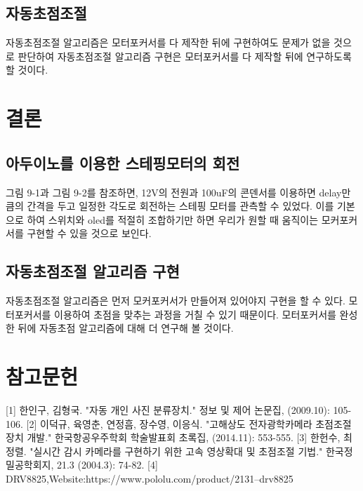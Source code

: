 \subsection{자동초점조절}
	
	자동초점조절 알고리즘은 모터포커서를 다 제작한 뒤에 구현하여도 문제가 없을 것으로 판단하여 자동초점조절 알고리즘 구현은 모터포커서를 다 제작할 뒤에 연구하도록 할 것이다.
	
	\section{결론}
	
	\subsection{아두이노를 이용한 스테핑모터의 회전}
	
	그림 9-1과 그림 9-2를 참조하면, 12V의 전원과 100uF의 콘덴서를 이용하면 delay만큼의 간격을 두고 일정한 각도로 회전하는 스테핑 모터를 관측할 수 있었다. 이를 기본으로 하여 스위치와 oled를 적절히 조합하기만 하면 우리가 원할 때 움직이는 모커포커서를 구현할 수 있을 것으로 보인다.
	
	\subsection{자동초점조절 알고리즘 구현}
	
	자동초점조절 알고리즘은 먼저 모커포커서가 만들어져 있어야지 구현을 할 수 있다. 모터포커서를 이용하여 초점을 맞추는 과정을 거칠 수 있기 때문이다. 모터포커서를 완성한 뒤에 자동초점 알고리즘에 대해 더 연구해 볼 것이다.
	
	\section{참고문헌}
	
	  [1] 한인구, 김형국. "자동 개인 사진 분류장치." 정보 및 제어 논문집,  (2009.10): 105-106.
	[2] 이덕규, 육영춘, 연정흠, 장수영, 이응식. "고해상도 전자광학카메라 초점조절장치 개발." 한국항공우주학회 학술발표회 초록집,  (2014.11): 553-555.
	[3] 한헌수, 최정렬. "실시간 감시 카메라를 구현하기 위한 고속 영상확대 및 초점조절 기법." 한국정밀공학회지, 21.3 (2004.3): 74-82.
	[4] DRV8825,Website:https://www.pololu.com/product/2131--drv8825

 \cite{megeath2012spitzer}\\
